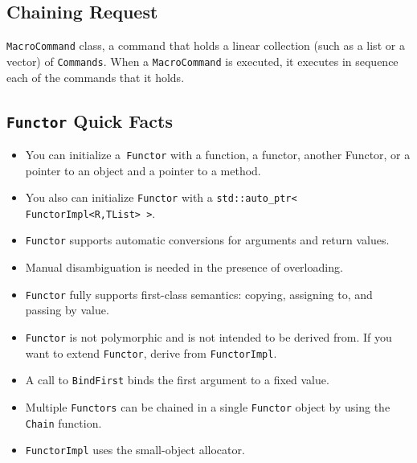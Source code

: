\subsection{Chaining Request}

\texttt{MacroCommand} class, a command that holds a
linear collection (such as a list or a vector) of
\texttt{Commands}. When a \texttt{MacroCommand} is executed, it
executes in sequence each of the commands that it holds.


\subsection{\texttt{Functor} Quick Facts}

\begin{itemize}
\item You can initialize a\texttt{ Functor} with a function, a
  functor, another Functor, or a pointer to an object and a pointer to
  a method.
\item You also can initialize \texttt{Functor} with a
  \texttt{std::auto\_ptr< FunctorImpl<R,TList> >}.
\item \texttt{Functor} supports automatic conversions for arguments
  and return values.
\item Manual disambiguation is needed in the presence of overloading.
\item \texttt{Functor} fully supports first-class semantics: copying,
  assigning to, and passing by value.
\item \texttt{Functor} is not polymorphic and is not intended to be
  derived from. If you want to extend \texttt{Functor}, derive from
  \texttt{FunctorImpl}.
\item  A call to \texttt{BindFirst} binds the first argument to a
  fixed value.
\item Multiple \texttt{Functors} can be chained in a single
  \texttt{Functor} object by using the \texttt{Chain} function. 
\item \texttt{FunctorImpl} uses the small-object allocator.
\end{itemize}

